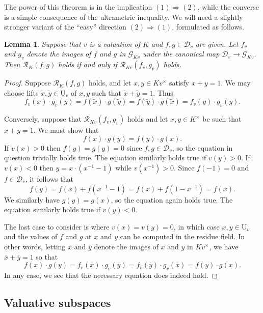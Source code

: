 \documentclass[12pt]{amsart}
\newcommand{\Urm}{\mathrm{U}}
\newcommand{\Gcal}{\mathcal{G}}
\newcommand{\Rcal}{\mathcal{R}}
\newcommand{\Dcal}{\mathcal{D}}
\renewcommand{\tilde}{\widetilde}
\renewcommand{\bar}{\overline}
\newtheorem{lemma}[theorem]{Lemma}
\theoremstyle{definition}
\begin{document}
The power of this theorem is in the implication $(1) \Rightarrow (2)$, while the converse is a simple consequence of the ultrametric inequality.
We will need a slightly stronger variant of the ``easy'' direction $(2) \Rightarrow (1)$, formulated as follows.
\begin{lemma}\label{lemma:Rcal_residue_compat}
  Suppose that $v$ is a valuation of $K$ and $f,g \in \Dcal_{v}$ are given.
  Let $f_{v}$ and $g_{v}$ denote the images of $f$ and $g$ in $\Gcal_{Kv}$ under the canonical map $\Dcal_{v} \to \Gcal_{Kv}$.
  Then $\Rcal_{K}(f,g)$ holds if and only if $\Rcal_{Kv}(f_{v},g_{v})$ holds.
\end{lemma}
\begin{proof}
  Suppose $\Rcal_{K}(f,g)$ holds, and let $x,y \in Kv^{\times}$ satisfy $x + y = 1$.
  We may choose lifts $\tilde x, \tilde y \in \Urm_{v}$ of $x, y$ such that $\tilde x + \tilde y = 1$.
  Thus
  \[ f_{v}(x) \cdot g_{v}(y) = f(\tilde x) \cdot g(\tilde y) = f(\tilde y) \cdot g(\tilde x) = f_{v}(y) \cdot g_{v}(y). \]

  Conversely, suppose that $\Rcal_{Kv}(f_{v},g_{v})$ holds and let $x,y \in K^{\times}$ be such that $x + y = 1$.
  We must show that
  \[ f(x) \cdot g(y) = f(y) \cdot g(x). \]
  If $v(x) > 0$ then $f(y) = g(y) = 0$ since $f,g \in \Dcal_{v}$, so the equation in question trivially holds true.
  The equation similarly holds true if $v(y) > 0$.
  If $v(x) < 0$ then $y = x \cdot (x^{-1} - 1)$ while $v(x^{-1}) > 0$.
  Since $f(-1) = 0$ and $f \in \Dcal_{v}$, it follows that
  \[ f(y) = f(x) + f(x^{-1}-1) = f(x) + f(1-x^{-1}) = f(x). \]
  We similarly have $g(y) = g(x)$, so the equation again holds true.
  The equation similarly holds true if $v(y) < 0$.

  The last case to consider is where $v(x) = v(y) = 0$, in which case $x,y \in \Urm_{v}$ and the values of $f$ and $g$ at $x$ and $y$ can be computed in the residue field.
  In other words, letting $\bar x$ and $\bar y$ denote the images of $x$ and $y$ in $Kv^\times$, we have $ \bar x + \bar y = 1$ so that
  \[ f(x) \cdot g(y) = f_{v}(\bar x) \cdot g_{v}(\bar y) = f_{v}(\bar y) \cdot g_{v}(\bar x) = f(y) \cdot g(x). \]
  In any case, we see that the necessary equation does indeed hold.
\end{proof}

\subsection{Valuative subspaces}
\end{document}
